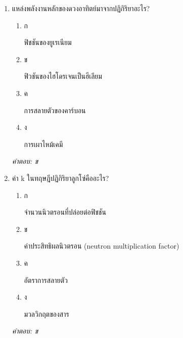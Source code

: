 \documentclass[12pt]{article}
\begin{document}
\begin{enumerate}[label=\arabic*., itemsep=0.5\baselineskip, topsep=0.5\baselineskip, leftmargin=*]
\item แหล่งพลังงานหลักของดวงอาทิตย์มาจากปฏิกิริยาอะไร?
\begin{enumerate}[label=\alph*)., itemsep=0.3\baselineskip, topsep=0.3\baselineskip]
\item ก\ 
\begin{minipage}[t]{0.9\linewidth}
\raggedright ฟิชชันของยูเรเนียม
\end{minipage}
\item ข\ 
\begin{minipage}[t]{0.9\linewidth}
\raggedright ฟิวชันของไฮโดรเจนเป็นฮีเลียม
\end{minipage}
\item ค\ 
\begin{minipage}[t]{0.9\linewidth}
\raggedright การสลายตัวของคาร์บอน
\end{minipage}
\item ง\ 
\begin{minipage}[t]{0.9\linewidth}
\raggedright การเผาไหม้เคมี
\end{minipage}
\end{enumerate}
\vspace{-0.3\baselineskip}
\begin{small}
\textit{คำตอบ: ข}
\end{small}

\item ค่า k ในทฤษฎีปฏิกิริยาลูกโซ่คืออะไร?
\begin{enumerate}[label=\alph*)., itemsep=0.3\baselineskip, topsep=0.3\baselineskip]
\item ก\ 
\begin{minipage}[t]{0.9\linewidth}
\raggedright จำนวนนิวตรอนที่ปล่อยต่อฟิชชัน
\end{minipage}
\item ข\ 
\begin{minipage}[t]{0.9\linewidth}
\raggedright ค่าประสิทธิผลนิวตรอน (neutron multiplication factor)
\end{minipage}
\item ค\ 
\begin{minipage}[t]{0.9\linewidth}
\raggedright อัตราการสลายตัว
\end{minipage}
\item ง\ 
\begin{minipage}[t]{0.9\linewidth}
\raggedright มวลวิกฤตของสาร
\end{minipage}
\end{enumerate}
\vspace{-0.3\baselineskip}
\begin{small}
\textit{คำตอบ: ข}
\end{small}


\end{enumerate}
\end{document}
